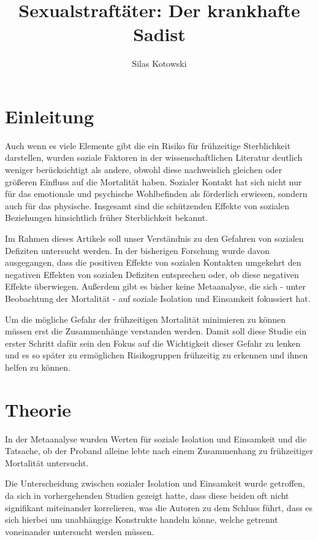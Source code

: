 \documentclass[doc]{apa6}
\begin{document}
\large
    \title{ Sexualstraftäter: Der krankhafte Sadist}
    \author{Silas Kotowski}
    \maketitle
    
    
    \section{Einleitung}
        
        Auch wenn es viele Elemente gibt die ein Risiko für frühzeitige Sterblichkeit darstellen, wurden soziale Faktoren in der wissenschaftlichen Literatur deutlich weniger berücksichtigt als andere, obwohl diese nachweislich gleichen oder größeren Einfluss auf die Mortalität haben.
        Sozialer Kontakt hat sich nicht nur für das  emotionale und psychische Wohlbefinden als förderlich erwiesen, sondern auch für das physische.  Insgesamt sind die schützenden Effekte von sozialen Beziehungen hinsichtlich früher Sterblichkeit bekannt.
        
        Im Rahmen dieses Artikels soll unser Verständnis zu den Gefahren von sozialen Defiziten untersucht werden. In der bisherigen Forschung wurde davon ausgegangen, dass die positiven Effekte von sozialen Kontakten umgekehrt den negativen Effekten von sozialen Defiziten entsprechen oder, ob diese negativen Effekte überwiegen. Außerdem gibt es bisher keine Metaanalyse, die sich - unter Beobachtung der Mortalität - auf soziale Isolation und Einsamkeit fokussiert hat.

        Um die mögliche Gefahr der frühzeitigen Mortalität minimieren zu können müssen erst die Zusammenhänge verstanden werden. Damit soll diese Studie ein erster Schritt dafür sein den Fokus auf die Wichtigkeit dieser Gefahr zu lenken und es so später zu ermöglichen Risikogruppen frühzeitig zu erkennen und ihnen helfen zu können.

    \section{Theorie}
            In der Metaanalyse wurden Werten für soziale Isolation und Einsamkeit und die Tatsache, ob der Proband alleine lebte nach einem Zusammenhang zu frühzeitiger Mortalität untersucht. 
            
            Die Unterscheidung zwischen sozialer Isolation und Einsamkeit wurde getroffen, da sich in vorhergehenden Studien gezeigt hatte, dass diese beiden oft nicht signifikant miteinander korrelieren, was die Autoren zu dem Schluss führt, dass es sich hierbei um unabhängige Konstrukte handeln könne, welche getrennt voneinander untersucht werden müssen.
            
\end{document}

